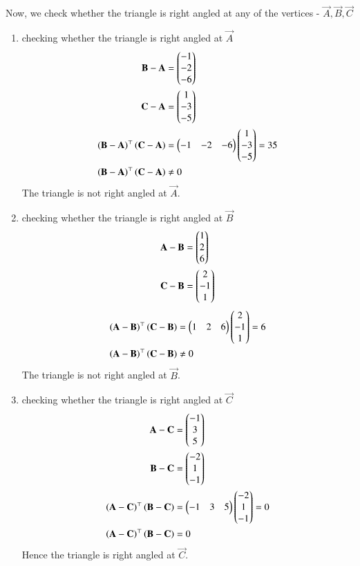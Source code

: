 \documentclass[journal,12pt,twocolumn]{IEEEtran}
\begin{document}
\begin{enumerate}
Now, we check whether the triangle is right angled at any of the vertices -
$ \vec{A}, \vec{B}, \vec{C}$
 
\begin{enumerate}
\item checking whether the triangle is right angled at $\vec{A}$
\begin{align}
\mathbf{B}-\mathbf{A} &= \begin{pmatrix}-1\\-2\\-6\end{pmatrix} \\
\mathbf{C}-\mathbf{A} &= \begin{pmatrix}1\\-3\\-5\end{pmatrix} \\
\left(\mathbf{B}-\mathbf{A}\right)^{\top}\left(\mathbf{C}-\mathbf{A}\right) &= \begin{pmatrix}-1&-2&-6\end{pmatrix}\begin{pmatrix}1\\-3\\-5\end{pmatrix} = 35\\
\left(\mathbf{B}-\mathbf{A}\right)^{\top}\left(\mathbf{C}-\mathbf{A}\right) &\neq 0
\end{align}
The triangle is not right angled at $\vec{A}$.\\

\item checking whether the triangle is right angled at $\vec{B}$
\begin{align}
\mathbf{A}-\mathbf{B} &= \begin{pmatrix}1\\2\\6\end{pmatrix} \\
\mathbf{C}-\mathbf{B} &= \begin{pmatrix}2\\-1\\1\end{pmatrix} 
\end{align}
\begin{align}
\left(\mathbf{A}-\mathbf{B}\right)^{\top}\left(\mathbf{C}-\mathbf{B}\right) &= \begin{pmatrix}1&2&6\end{pmatrix}\begin{pmatrix}2\\-1\\1\end{pmatrix} = 6\\
\left(\mathbf{A}-\mathbf{B}\right)^{\top}\left(\mathbf{C}-\mathbf{B}\right) &\neq 0
\end{align}
The triangle is not right angled at $\vec{B}$.\\

\item checking whether the triangle is right angled at $\vec{C}$
\begin{align}
\mathbf{A}-\mathbf{C} &= \begin{pmatrix}-1\\3\\5\end{pmatrix} \\
\mathbf{B}-\mathbf{C} &= \begin{pmatrix}-2\\1\\-1\end{pmatrix} \\
\left(\mathbf{A}-\mathbf{C}\right)^{\top}\left(\mathbf{B}-\mathbf{C}\right) &= \begin{pmatrix}-1&3&5\end{pmatrix}\begin{pmatrix}-2\\1\\-1\end{pmatrix} = 0\\
\left(\mathbf{A}-\mathbf{C}\right)^{\top}\left(\mathbf{B}-\mathbf{C}\right) &= 0
\end{align}
Hence the triangle is right angled at $\vec{C}$.
\end{enumerate}
\end{enumerate}
\end{document}
